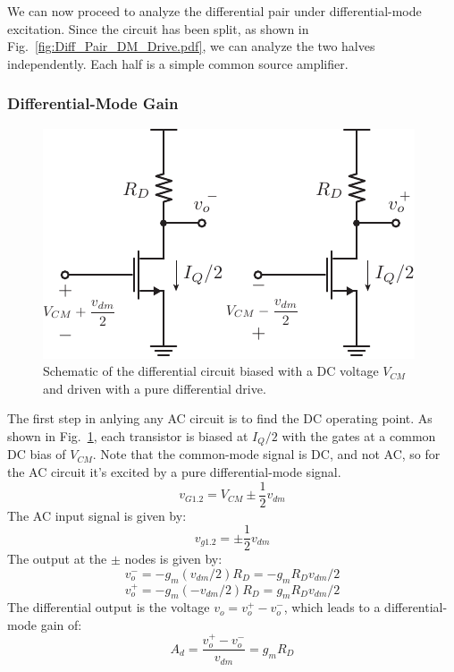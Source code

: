We can now proceed to analyze the differential pair under differential-mode excitation.  Since the circuit has been split, as shown in Fig.~\ref{fig:Diff_Pair_DM_Drive.pdf}, we can analyze the two halves independently.  Each half is a simple common source amplifier.
 


\subsubsection{Differential-Mode Gain}


\begin{figure}[tb]
\begin{center}
\includegraphics[scale=1]{Diff_ss_gain.pdf}
\end{center}
\caption{Schematic of the differential circuit biased with a DC voltage $V_{CM}$ and driven with a pure differential drive.} \label{fig:Diff_ss_gain.pdf}
\end{figure}


The first step in anlying any AC circuit is to find the DC operating point.  As shown in Fig.~\ref{fig:Diff_ss_gain.pdf}, each transistor is biased at $I_Q/2$ with the gates at a common DC bias of $V_{CM}$.  Note that the common-mode signal is DC, and not AC, so for the AC circuit it's excited by a pure differential-mode signal.
%
\begin{equation}
	{v_{G1.2}} = {V_{CM}} \pm \frac{1}{2}{v_{dm}}
\end{equation}
%
The AC input signal is given by:
%
\begin{equation}
	{v_{g1.2}} = \pm \frac{1}{2}{v_{dm}}
\end{equation}
%
The output at the $\pm$ nodes is given by:
%
\begin{equation}
	{v_{o}^-} = - {g_m}({v_{dm}}/2){R_D} =  - {g_m}{R_D}{v_{dm}}/2
\end{equation}
\begin{equation} 
	{v_{o}^+} = - {g_m}( - {v_{dm}}/2){R_D} = {g_m}{R_D}{v_{dm}}/2 
\end{equation}
%
The differential output is the voltage $v_o = v_o^+ - v_o^-$, which leads to a differential-mode gain of:
%
\begin{equation} 
	{A_d} = \frac{{{v_{o}^+} - {v_{o}^-}}}{{{v_{dm}}}} = {g_m}{R_D}
\end{equation}

